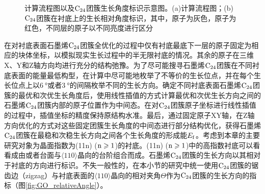 \begin{figure}[htb]
    \caption{计算流程图以及$\rm{C_{24}}$团簇生长角度标识示意图。(a)计算流程图；(b)$\rm{C_{24}}$团簇在衬底上的生长相对角度标识，其中，原子为灰色，原子为红色，不同层的原子以不同亮度进行区分}
    \label{fig:GO_calculateFlow_relativeAngle}
\end{figure}

在对衬底表面石墨烯$\rm{C_{24}}$团簇全优化的过程中仅有衬底最底下一层的原子固定为相应的块体坐标，以模拟现实生长过程中的半无限衬底的情况。其余的原子在三维X、Y和Z轴方向均进行充分的结构弛豫。为了尽可能搜寻石墨烯$\rm{C_{24}}$团簇在不同衬底表面的能量最低构型，在计算中尽可能地枚举了不等价的生长位点，并在每个生长位点上以$\SI{6}{\degree}$或者$\SI{3}{\degree}$的间隔枚举不同的生长方向。确定不同衬底表面石墨烯$\rm{C_{24}}$团簇的最优和次优生长角度后，使用线性插值的方式计算最优和次优生长方向之间的石墨烯$\rm{C_{24}}$团簇内部的原子位置作为中间态。在对$\rm{C_{24}}$团簇原子坐标进行线性插值的过程中，插值坐标的精度保持原结构水准。最后，通过固定原子XY轴，在Z轴方向优化的方式对这些固定团簇生长角度的中间态进行部分结构优化，获得石墨烯$\rm{C_{24}}$团簇在最稳和次稳生长方向之间各个生长角度的形成能$E_{\rm{f}}$。考虑到本章的主要研究对象为晶面指数为(11n) ($\rm{n \geqslant 1}$)的衬底。(11n) ($\rm{n \geqslant 1}$)中的高指数衬底可以看看成由或者台面与$\langle 110\rangle$晶向的台阶组合而成。石墨烯$\rm{C_{24}}$团簇的生长方向以其相对于衬底的方向进行标识。不失一般性的，在本小节的研究中统一使用$\rm{C_{24}}$团簇的锯齿边（zigzag）与衬底表面的$\langle 110\rangle$晶向的相对夹角$\Theta$作为$\rm{C_{24}}$团簇的生长方向的指标（图\ref{fig:GO_relativeAngle}）。


